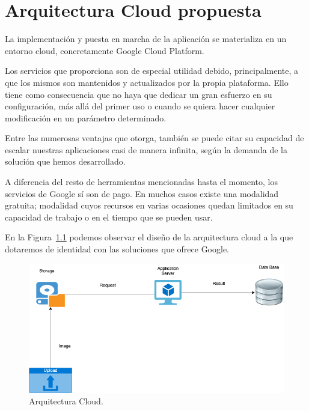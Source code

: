 \mbox{}

\lstset{
language=Python,
basicstyle=\small\sffamily,
numbers=left,
numberstyle=\tiny,
frame=tb,
columns=fullflexible,
showstringspaces=false
}
\chapter{Arquitectura Cloud propuesta}
\label{ch:chapter4}
La implementación y puesta en marcha de la aplicación se materializa en un entorno cloud, concretamente Google Cloud Platform.

Los servicios que proporciona son de especial utilidad debido, principalmente, a que los mismos son mantenidos y actualizados por la propia plataforma.
Ello tiene como consecuencia que no haya que dedicar un gran esfuerzo en su configuración, más allá del primer uso o cuando se quiera hacer cualquier modificación en un parámetro determinado.

Entre las numerosas ventajas que otorga, también se puede citar su capacidad de escalar nuestras aplicaciones casi de manera infinita, según la demanda de la solución que hemos desarrollado.

A diferencia del resto de herramientas mencionadas hasta el momento, los servicios de Google sí son de pago. En muchos casos existe una modalidad gratuita; modalidad cuyos recursos en varias ocasiones quedan limitados en su capacidad de trabajo o en el tiempo que se pueden usar.

En la Figura~\ref{fig:Arquitectura Cloud} podemos observar el diseño de la arquitectura cloud a la que dotaremos de identidad con las soluciones que ofrece Google.

\begin{figure}
    \centering
    \includegraphics[width=1.0\textwidth]{images/chapter4/cloud_architecture.png}
    \caption{Arquitectura Cloud.}
    \label{fig:Arquitectura Cloud}
\end{figure}

